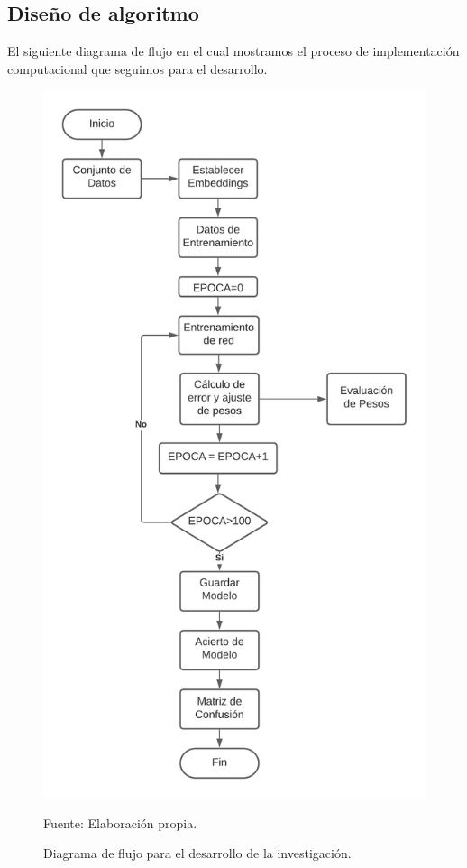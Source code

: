 \newpage

\subsection{Diseño de algoritmo}

El siguiente diagrama de flujo en el cual mostramos el proceso de implementación computacional que seguimos para el desarrollo.

\begin{figure}[H]
	\centering
		\includegraphics[scale=0.8]{imagenes/flujograma.png}
		\caption{Diagrama de flujo para el desarrollo de la investigación.}
	\begin{center}
    Fuente: Elaboración propia.
    \end{center}
	\label{fig:39}
\end{figure}
\newpage
